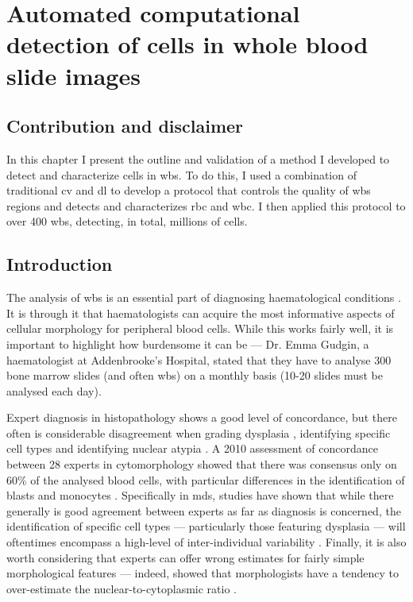 \chapter{Automated computational detection of cells in whole blood slide images}

\section{Contribution and disclaimer}

In this chapter I present the outline and validation of a method I developed to detect and characterize cells in \ac{wbs}. To do this, I used a combination of traditional \ac{cv} and \ac{dl} to develop a protocol that controls the quality of \ac{wbs} regions and detects and characterizes \ac{rbc} and \ac{wbc}. I then applied this protocol to over 400 \ac{wbs}, detecting, in total, millions of cells. 

\section{Introduction}

The analysis of \ac{wbs} is an essential part of diagnosing haematological conditions \cite{Bain2014-oc}. It is through it that haematologists can acquire the most informative aspects of cellular morphology for peripheral blood cells. While this works fairly well, it is important to highlight how burdensome it can be --- Dr. Emma Gudgin, a haematologist at Addenbrooke's Hospital, stated that they have to analyse 300 bone marrow slides (and often \ac{wbs}) on a monthly basis (10-20 slides must be analysed each day).

Expert diagnosis in histopathology shows a good level of concordance, but there often is considerable disagreement when grading dysplasia \cite{Azam2021-su}, identifying specific cell types \cite{Goasguen2009-dn,Foucar2020-uz} and identifying nuclear atypia \cite{Azam2021-su,Weinberg2015-ra}. A 2010 assessment of concordance between 28 experts in cytomorphology showed that there was consensus only on 60\% of the analysed blood cells, with particular differences in the identification of blasts and monocytes \cite{Zini2010-kg}. Specifically in \ac{mds}, studies have shown that while there generally is good agreement between experts as far as diagnosis is concerned, the identification of specific cell types --- particularly those featuring dysplasia --- will oftentimes encompass a high-level of inter-individual variability \cite{De_Swart2017-wc,Howe2004-mn}. Finally, it is also worth considering that experts can offer wrong estimates for fairly simple morphological features --- indeed,  showed that morphologists have a tendency to over-estimate the nuclear-to-cytoplasmic ratio \cite{Zhang2016-sv}.

